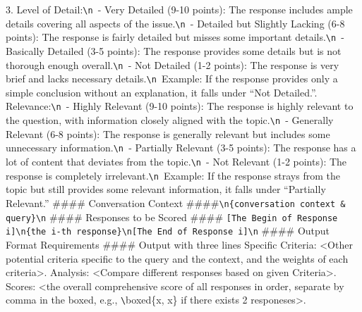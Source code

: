 \documentclass{article} %
\newcommand{\SGRMAll}{DeepSeek-GRM\xspace}
\begin{document}
\begin{tcolorbox}[title={\SGRMAll (Default)}, colbacktitle=blue!50!white, coltitle=white, fonttitle=\bfseries, colback=blue!10!white, boxrule=0pt, breakable]
3. Level of Detail:\verb|\n |- Very Detailed (9-10 points): The response includes ample details covering all aspects of the issue.\verb|\n |- Detailed but Slightly Lacking (6-8 points): The response is fairly detailed but misses some important details.\verb|\n |- Basically Detailed (3-5 points): The response provides some details but is not thorough enough overall.\verb|\n |- Not Detailed (1-2 points): The response is very brief and lacks necessary details.\verb|\n |Example: If the response provides only a simple conclusion without an explanation, it falls under ``Not Detailed.''. Relevance:\verb|\n |- Highly Relevant (9-10 points): The response is highly relevant to the question, with information closely aligned with the topic.\verb|\n |- Generally Relevant (6-8 points): The response is generally relevant but includes some unnecessary information.\verb|\n |- Partially Relevant (3-5 points): The response has a lot of content that deviates from the topic.\verb|\n |- Not Relevant (1-2 points): The response is completely irrelevant.\verb|\n |Example: If the response strays from the topic but still provides some relevant information, it falls under ``Partially Relevant.''\newline
\newline
\#\#\#\# Conversation Context \#\#\#\#\verb|\n|\verb|{conversation context & query}|\verb|\n|\newline
\#\#\#\# Responses to be Scored \#\#\#\#\newline
\verb|[The Begin of Response i]\n{the i-th response}\n[The End of Response i]\n|
\newline
\#\#\#\# Output Format Requirements \#\#\#\#\newline
\newline
Output with three lines\newline
Specific Criteria: <Other potential criteria specific to the query and the context, and the weights of each criteria>.\newline
Analysis: <Compare different responses based on given Criteria>.\newline
Scores: <the overall comprehensive score of all responses in order, separate by comma in the boxed, e.g., \verb|\|boxed\{x, x\} if there exists 2 responeses>. 
\end{tcolorbox}
\end{document}
